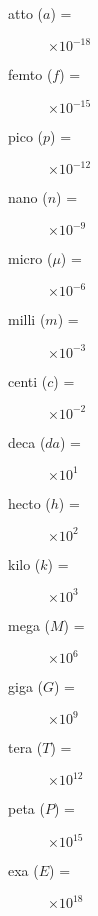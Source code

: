 \begin{description}
\item[atto ($a$) =]$\times 10^{-18}$
\item[femto ($f$) =]$\times 10^{-15}$
\item[pico ($p$) =]$\times 10^{-12}$
\item[nano ($n$) =]$\times 10^{-9}$
\item[micro ($\mu$) =]$\times 10^{-6}$
\item[milli ($m$) =]$\times 10^{-3}$
\item[centi ($c$) =]$\times 10^{-2}$
\item[deca ($da$) =]$\times 10^1$
\item[hecto ($h$) =]$\times 10^2$
\item[kilo ($k$) =]$\times 10^3$
\item[mega ($M$) =]$\times 10^6$
\item[giga ($G$) =]$\times 10^9$
\item[tera ($T$) =]$\times 10^{12}$
\item[peta ($P$) =]$\times 10^{15}$
\item[exa ($E$) =]$\times 10^{18}$
\end{description}
